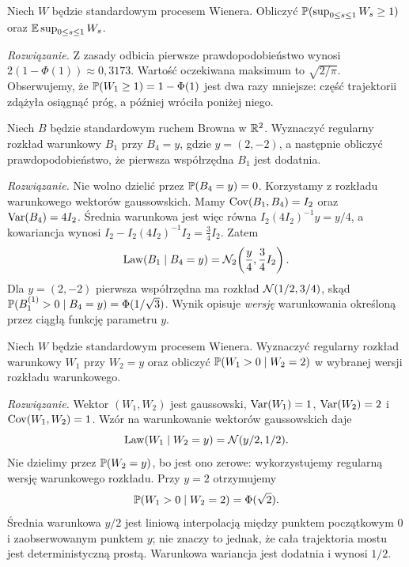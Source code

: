 \begin{zadanie}
Niech $W$ będzie standardowym procesem Wienera.
Obliczyć $\mathbb{P}(\sup_{0\le s\le1}W_s\ge1)$ oraz
$\mathbb{E}\sup_{0\le s\le1}W_s$.

\emph{Rozwiązanie.} Z zasady odbicia pierwsze
prawdopodobieństwo wynosi $2(1-\Phi(1))\approx0{,}3173$.
Wartość oczekiwana maksimum to $\sqrt{2/\pi}$.
Obserwujemy, że $\mathbb{P}(W_1\ge1)=1-\Phi(1)$ jest dwa razy
mniejsze: część trajektorii zdążyła osiągnąć próg,
a później wróciła poniżej niego.
\end{zadanie}


\begin{zadanie}
Niech $B$ będzie standardowym ruchem Browna w $\mathbb{R}^2$.
Wyznaczyć regularny rozkład warunkowy $B_1$ przy $B_4=y$,
gdzie $y=(2,-2)$, a następnie obliczyć prawdopodobieństwo,
że pierwsza współrzędna $B_1$ jest dodatnia.

\emph{Rozwiązanie.} Nie wolno dzielić przez $\mathbb{P}(B_4=y)=0$.
Korzystamy z rozkładu warunkowego wektorów gaussowskich.
Mamy $\operatorname{Cov}(B_1,B_4)=I_2$ oraz $\operatorname{Var}(B_4)=4I_2$.
Średnia warunkowa jest więc równa $I_2(4I_2)^{-1}y=y/4$,
a kowariancja wynosi
$I_2-I_2(4I_2)^{-1}I_2=\tfrac34 I_2$.
Zatem
\[
\operatorname{Law}(B_1\mid B_4=y)=\mathcal{N}_2\!\left(\frac{y}{4},\frac34 I_2\right).
\]
Dla $y=(2,-2)$ pierwsza współrzędna ma rozkład
$\mathcal{N}(1/2,3/4)$, skąd
$\mathbb{P}(B_1^{(1)}>0\mid B_4=y)=\Phi(1/\sqrt3)$.
Wynik opisuje \emph{wersję} warunkowania określoną
przez ciągłą funkcję parametru $y$.
\end{zadanie}

\begin{zadanie}
Niech $W$ będzie standardowym procesem Wienera. Wyznaczyć
regularny rozkład warunkowy $W_1$ przy $W_2=y$ oraz
obliczyć $\mathbb{P}(W_1>0\mid W_2=2)$ w wybranej wersji
rozkładu warunkowego.

\emph{Rozwiązanie.} Wektor $(W_1,W_2)$ jest gaussowski,
$\operatorname{Var}(W_1)=1$, $\operatorname{Var}(W_2)=2$ i
$\operatorname{Cov}(W_1,W_2)=1$. Wzór na warunkowanie wektorów
gaussowskich daje
\[
\operatorname{Law}(W_1\mid W_2=y)=\mathcal{N}(y/2,1/2).
\]
Nie dzielimy przez $\mathbb{P}(W_2=y)$, bo jest ono zerowe:
wykorzystujemy regularną wersję warunkowego rozkładu.
Przy $y=2$ otrzymujemy
\[
\mathbb{P}(W_1>0\mid W_2=2)=\Phi(\sqrt 2).
\]
Średnia warunkowa $y/2$ jest liniową interpolacją
między punktem początkowym $0$ i zaobserwowanym punktem
$y$; nie znaczy to jednak, że cała trajektoria mostu
jest deterministyczną prostą. Warunkowa wariancja jest
dodatnia i wynosi $1/2$.
\end{zadanie}

